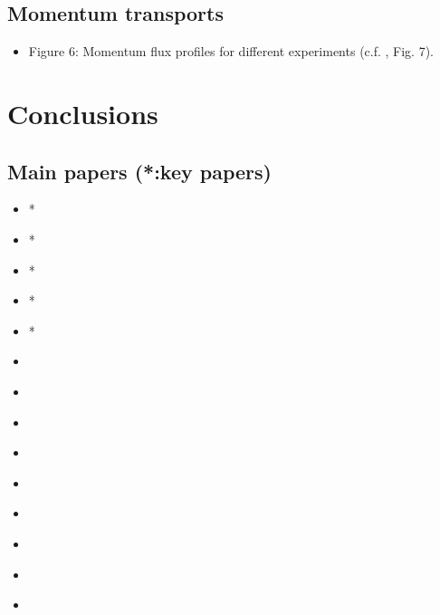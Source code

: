 \documentclass[11pt,a4paper]{article}
\begin{document}
\subsection{Momentum transports}
\begin{itemize}
    \item Figure 6: Momentum flux profiles for different experiments (c.f. \cite{RE2001}, Fig. 7).
\end{itemize}
\section{Conclusions}

\newpage
\subsection*{Main papers (*:key papers)}
\begin{itemize}
    \item * \cite{CC2006I}
    \item * \cite{CC2006II}
    \item * \cite{RE2001}
    \item * \cite{RKW1988}
    \item * \cite{PC2008}
    \item \cite{birch2014scale}
    \item \cite{cohen2004response}
    \item \cite{gregory1997parametrization}
    \item \cite{houze1977structure}
    \item \cite{kershaw1997parametrization}
    \item \cite{robe1996moist}
    \item \cite{sakradzija2016stochastic}
    \item \cite{sengupta1990cumulus}
    \item \cite{TMM1982}
\end{itemize}


\printbibliography[title={References}]
\end{document}
